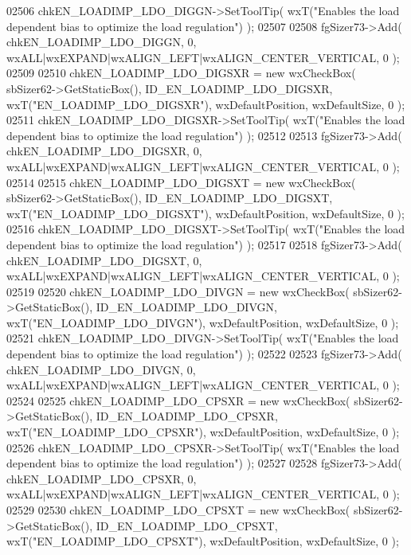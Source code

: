 \begin{DoxyCode}
02506     chkEN_LOADIMP_LDO_DIGGN->SetToolTip( wxT(\textcolor{stringliteral}{"Enables the load dependent bias to optimize the load
       regulation"}) );
02507     
02508     fgSizer73->Add( chkEN_LOADIMP_LDO_DIGGN, 0, wxALL|wxEXPAND|wxALIGN\_LEFT|wxALIGN\_CENTER\_VERTICAL, 0 );
02509     
02510     chkEN_LOADIMP_LDO_DIGSXR = \textcolor{keyword}{new} wxCheckBox( sbSizer62->GetStaticBox(), 
      ID_EN_LOADIMP_LDO_DIGSXR, wxT(\textcolor{stringliteral}{"EN\_LOADIMP\_LDO\_DIGSXR"}), wxDefaultPosition, wxDefaultSize, 0 );
02511     chkEN_LOADIMP_LDO_DIGSXR->SetToolTip( wxT(\textcolor{stringliteral}{"Enables the load dependent bias to optimize the load
       regulation"}) );
02512     
02513     fgSizer73->Add( chkEN_LOADIMP_LDO_DIGSXR, 0, wxALL|wxEXPAND|wxALIGN\_LEFT|wxALIGN\_CENTER\_VERTICAL, 0 );
02514     
02515     chkEN_LOADIMP_LDO_DIGSXT = \textcolor{keyword}{new} wxCheckBox( sbSizer62->GetStaticBox(), 
      ID_EN_LOADIMP_LDO_DIGSXT, wxT(\textcolor{stringliteral}{"EN\_LOADIMP\_LDO\_DIGSXT"}), wxDefaultPosition, wxDefaultSize, 0 );
02516     chkEN_LOADIMP_LDO_DIGSXT->SetToolTip( wxT(\textcolor{stringliteral}{"Enables the load dependent bias to optimize the load
       regulation"}) );
02517     
02518     fgSizer73->Add( chkEN_LOADIMP_LDO_DIGSXT, 0, wxALL|wxEXPAND|wxALIGN\_LEFT|wxALIGN\_CENTER\_VERTICAL, 0 );
02519     
02520     chkEN_LOADIMP_LDO_DIVGN = \textcolor{keyword}{new} wxCheckBox( sbSizer62->GetStaticBox(), 
      ID_EN_LOADIMP_LDO_DIVGN, wxT(\textcolor{stringliteral}{"EN\_LOADIMP\_LDO\_DIVGN"}), wxDefaultPosition, wxDefaultSize, 0 );
02521     chkEN_LOADIMP_LDO_DIVGN->SetToolTip( wxT(\textcolor{stringliteral}{"Enables the load dependent bias to optimize the load
       regulation"}) );
02522     
02523     fgSizer73->Add( chkEN_LOADIMP_LDO_DIVGN, 0, wxALL|wxEXPAND|wxALIGN\_LEFT|wxALIGN\_CENTER\_VERTICAL, 0 );
02524     
02525     chkEN_LOADIMP_LDO_CPSXR = \textcolor{keyword}{new} wxCheckBox( sbSizer62->GetStaticBox(), 
      ID_EN_LOADIMP_LDO_CPSXR, wxT(\textcolor{stringliteral}{"EN\_LOADIMP\_LDO\_CPSXR"}), wxDefaultPosition, wxDefaultSize, 0 );
02526     chkEN_LOADIMP_LDO_CPSXR->SetToolTip( wxT(\textcolor{stringliteral}{"Enables the load dependent bias to optimize the load
       regulation"}) );
02527     
02528     fgSizer73->Add( chkEN_LOADIMP_LDO_CPSXR, 0, wxALL|wxEXPAND|wxALIGN\_LEFT|wxALIGN\_CENTER\_VERTICAL, 0 );
02529     
02530     chkEN_LOADIMP_LDO_CPSXT = \textcolor{keyword}{new} wxCheckBox( sbSizer62->GetStaticBox(), 
      ID_EN_LOADIMP_LDO_CPSXT, wxT(\textcolor{stringliteral}{"EN\_LOADIMP\_LDO\_CPSXT"}), wxDefaultPosition, wxDefaultSize, 0 );

\end{DoxyCode}

